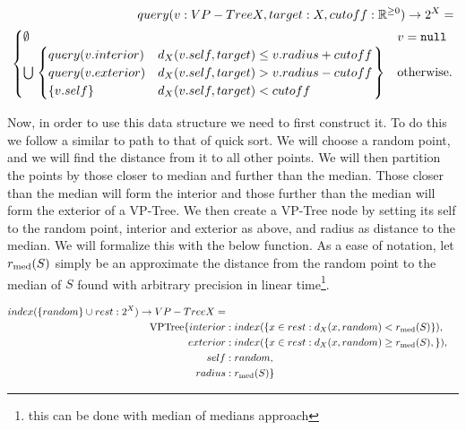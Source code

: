 \begin{align*}
query(v : VP-Tree X, target : X, cutoff : \mathbb{R}^{\ge 0}) \to 2^X = \\ \begin{cases}
    \emptyset & v = \texttt{null} \\ 
    \bigcup \left.\begin{cases}
        query(v.interior) & d_X(v.self, target) \le v.radius + cutoff \\ 
        query(v.exterior) & d_X(v.self, target) > v.radius - cutoff \\ 
        \{v.self\} & d_X(v.self, target) < cutoff
    \end{cases}\right\} & \text{otherwise.} 
\end{cases}
\end{align*}

Now, in order to use this data structure we need to first construct it.
To do this we follow a similar to path to that of quick sort.
We will choose a random point, and we will find the distance from it to all other points.
We will then partition the points by those closer to median and further than the median.
Those closer than the median will form the interior and those further than the median will form the exterior of a VP-Tree.
We then create a VP-Tree node by setting its self to the random point, interior and exterior as above, 
and radius as distance to the median. 
We will formalize this with the below function.
As a ease of notation, let $r_{\text{med}}(S)$ simply be an approximate the distance from the random point to the 
median of $S$ found with arbitrary precision in linear time\footnote{this can be done with median of medians approach}.

\begin{align*}
index(\{random\} \cup rest: 2^X) \to VP-Tree X = \\ 
\text{VPTree}\{interior&:index(\{x \in rest : d_X(x, random) < r_{\text{med}}(S)\}), \\
exterior&:index(\{x \in rest : d_X(x, random) \ge r_{\text{med}}(S), \}),\\ 
self&:random,\\
radius&:r_{\text{med}}(S)\}
\end{align*}